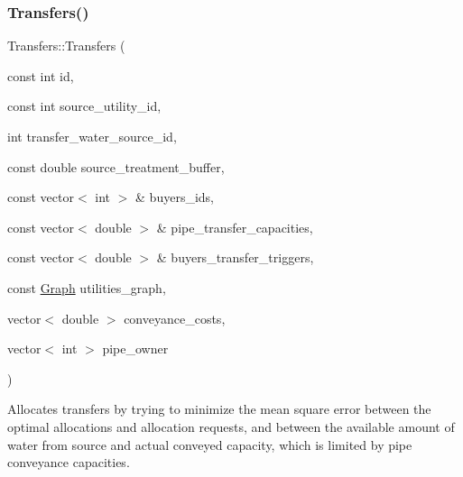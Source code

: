 \subsubsection{\texorpdfstring{Transfers()}{Transfers()}\hspace{0.1cm}{\footnotesize\ttfamily [1/2]}}
{\footnotesize\ttfamily Transfers\+::\+Transfers (\begin{DoxyParamCaption}\item[{const int}]{id,  }\item[{const int}]{source\+\_\+utility\+\_\+id,  }\item[{int}]{transfer\+\_\+water\+\_\+source\+\_\+id,  }\item[{const double}]{source\+\_\+treatment\+\_\+buffer,  }\item[{const vector$<$ int $>$ \&}]{buyers\+\_\+ids,  }\item[{const vector$<$ double $>$ \&}]{pipe\+\_\+transfer\+\_\+capacities,  }\item[{const vector$<$ double $>$ \&}]{buyers\+\_\+transfer\+\_\+triggers,  }\item[{const \mbox{\hyperlink{classGraph}{Graph}}}]{utilities\+\_\+graph,  }\item[{vector$<$ double $>$}]{conveyance\+\_\+costs,  }\item[{vector$<$ int $>$}]{pipe\+\_\+owner }\end{DoxyParamCaption})}

Allocates transfers by trying to minimize the mean square error between the optimal allocations and allocation requests, and between the available amount of water from source and actual conveyed capacity, which is limited by pipe conveyance capacities.


